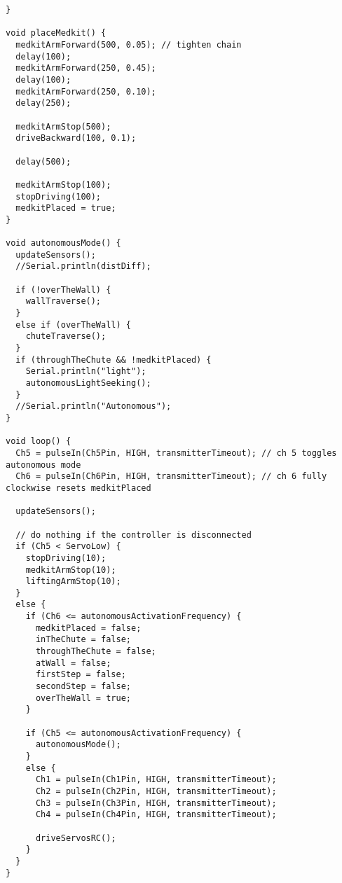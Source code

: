 \begin{lstlisting}[style=myArduino]
}

void placeMedkit() {
  medkitArmForward(500, 0.05); // tighten chain
  delay(100);
  medkitArmForward(250, 0.45);
  delay(100);
  medkitArmForward(250, 0.10);
  delay(250);
  
  medkitArmStop(500);
  driveBackward(100, 0.1);

  delay(500);
  
  medkitArmStop(100);
  stopDriving(100);
  medkitPlaced = true;
}

void autonomousMode() {
  updateSensors();
  //Serial.println(distDiff);

  if (!overTheWall) {
    wallTraverse();
  }
  else if (overTheWall) {
    chuteTraverse();
  }
  if (throughTheChute && !medkitPlaced) {
    Serial.println("light");
    autonomousLightSeeking();
  }
  //Serial.println("Autonomous");
}

void loop() {
  Ch5 = pulseIn(Ch5Pin, HIGH, transmitterTimeout); // ch 5 toggles autonomous mode
  Ch6 = pulseIn(Ch6Pin, HIGH, transmitterTimeout); // ch 6 fully clockwise resets medkitPlaced

  updateSensors();

  // do nothing if the controller is disconnected
  if (Ch5 < ServoLow) {
    stopDriving(10);
    medkitArmStop(10);
    liftingArmStop(10);
  } 
  else {
    if (Ch6 <= autonomousActivationFrequency) {
      medkitPlaced = false;
      inTheChute = false;
      throughTheChute = false;
      atWall = false;
      firstStep = false;
      secondStep = false;
      overTheWall = true;
    }
    
    if (Ch5 <= autonomousActivationFrequency) {
      autonomousMode();
    }
    else {
      Ch1 = pulseIn(Ch1Pin, HIGH, transmitterTimeout);
      Ch2 = pulseIn(Ch2Pin, HIGH, transmitterTimeout);
      Ch3 = pulseIn(Ch3Pin, HIGH, transmitterTimeout);
      Ch4 = pulseIn(Ch4Pin, HIGH, transmitterTimeout);

      driveServosRC();
    }
  }
}
\end{lstlisting}

\newpage